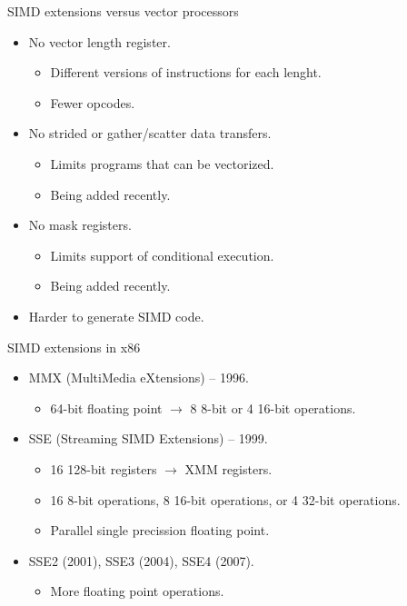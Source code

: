 \begin{frame}[t]{SIMD extensions versus vector processors}
\begin{itemize}

  \item No vector length register.
    \begin{itemize}
      \item Different versions of instructions for each lenght.
      \item Fewer opcodes.
    \end{itemize}

  \item No strided or gather/scatter data transfers.
    \begin{itemize}
      \item Limits programs that can be vectorized.
      \item Being added recently.
    \end{itemize}

  \item No mask registers.
    \begin{itemize}
      \item Limits support of conditional execution.
      \item Being added recently.
    \end{itemize}

  \item Harder to generate SIMD code.
\end{itemize}
\end{frame}

\begin{frame}[t]{SIMD extensions in x86}
\begin{itemize}
  \item MMX (MultiMedia eXtensions) -- 1996.
    \begin{itemize}
      \item 64-bit floating point $\rightarrow$ 8 8-bit or 4 16-bit operations.
    \end{itemize}

  \item SSE (Streaming SIMD Extensions) -- 1999.
    \begin{itemize}
      \item 16 128-bit registers $\rightarrow$ XMM registers.
      \item 16 8-bit operations, 8 16-bit operations, or 4 32-bit operations.
      \item Parallel single precission floating point.
    \end{itemize}

  \item SSE2 (2001), SSE3 (2004), SSE4 (2007).
    \begin{itemize}
      \item More floating point operations.
    \end{itemize}

\end{itemize}
\end{frame}

